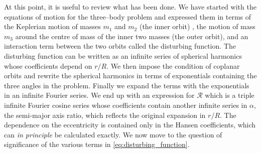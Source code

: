 \documentclass[twoside,openright,titlepage,numbers=noenddot,headinclude,%
                footinclude=true,cleardoublepage=empty,abstractoff, 
                BCOR=5mm,paper=a4,fontsize=11pt,%
                american,%
                ]{scrreprt}%
\begin{document}
At this point, it is useful to review what has been done. We have started
with the equations of motion for the three--body problem and expressed them
in terms of the Keplerian motion of masses $m_1$ and $m_2$ (the inner orbit) 
, the motion of mass $m_3$ around the centre of mass of the inner 
two masses (the outer orbit), and an interaction term between the two
orbits called the disturbing function. The disturbing function
can be written as an infinite series of spherical harmonics 
whose coefficients depend on $r/R$. We then impose the 
condition of coplanar orbits and rewrite the spherical harmonics in 
terms of exponentials containing the three angles in the problem. Finally
we expand the terms with the exponentials in an infinite Fourier series.
We end up with an expression for $\mathcal{R}$ which is a triple infinite
Fourier cosine series whose coefficients contain another infinite 
series in $\alpha$, the semi-major axis ratio, which reflects the original
expansion in $r/R$. The dependence on the eccentricity is contained
only in the Hansen coefficients, which can \emph{in principle} be
calculated exactly. We now move to the question of significance
of the various terms in \cref{eq:disturbing_function}.
\end{document}
